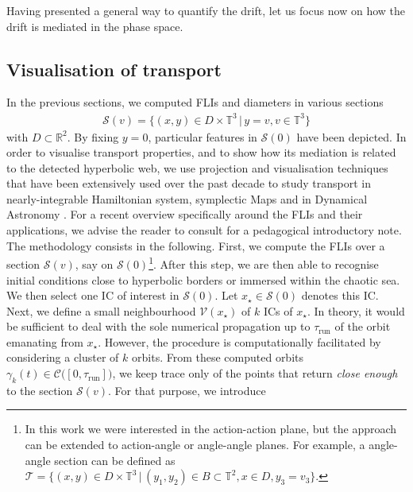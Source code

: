 \documentclass{amsart}
\theoremstyle{definition}
\theoremstyle{remark}
\numberwithin{equation}{section}
\begin{document}
Having presented  a general way to quantify the drift, let us focus now on how the drift is mediated in the phase space. 
 
\subsection{Visualisation of transport}
In the previous sections, we computed FLIs and diameters in various sections 
\begin{align}
	\mathcal{S}(v)=\big\{ (x,y) \in D \times\mathbb{T}^{3} \, \vert \, y=v, v \in \mathbb{T}^{3} \big\}
\end{align}
with $D \subset \mathbb{R}^{2}$.
By fixing $y=0$,  particular   features  in $\mathcal{S}(0)$ have been depicted. In order to visualise transport properties, and to show how its mediation is related to the detected hyperbolic web, we use projection and visualisation techniques 
that have been extensively used over {\color{black}the past} decade to study transport in nearly-integrable Hamiltonian system, symplectic Maps and in Dynamical Astronomy  \citep{mGu02,eLe03,pCi08,riPa15,nGu17}. For a recent overview specifically around the FLIs and their applications, we advise the reader to consult \cite{eLe16} for a pedagogical introductory note. 
The methodology consists in the following. First, we compute the FLIs over a  section $\mathcal{S}(v)$, say on $\mathcal{S}(0)$\footnote{
In this work we were interested in the action-action plane, but the approach can be extended to action-angle or angle-angle planes. For example, a angle-angle section can be defined as
$
	\mathcal{T}=\big\{ (x,y) \in D \times\mathbb{T}^{3} \, \vert \, (y_{1},y_{2}) \in B \subset \mathbb{T}^{2}, x \in D, y_{3}=v_{3} \big\}.
$
}. After this step, we are then able to recognise initial conditions  close to hyperbolic borders or immersed within the chaotic sea. We then select one IC of interest in  $\mathcal{S}(0)$. Let $x_{\star} \in \mathcal{S}(0)$ denotes this IC. Next, we define
a small neighbourhood $\mathcal{V}(x_{\star})$ of $k$ ICs of $x_{\star}$. In theory, it would be sufficient to deal with the sole numerical propagation up to $\tau_{\textrm{run}}$ of the orbit emanating from $x_{\star}$. However,  the procedure is computationally facilitated by considering a cluster of $k$ orbits. 
From these computed orbits $\gamma_{k}(t)  \in \mathcal{C}\big([0,\tau_{\textrm{run}}]\big)$, 
we keep trace only of the points {\color{black}that} return \textit{close enough} to the section $\mathcal{S}(v)$. For that purpose, we introduce 
\end{document}
